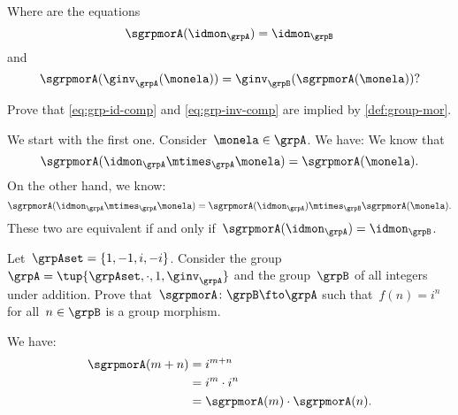 Where are the equations
\begin{equation}
  \label{eq:grp-id-comp}
  \sgrpmorA (\idmon_\grpA) = \idmon_{\grpB}
\end{equation}
and
\begin{equation}
  \label{eq:grp-inv-comp}
  \sgrpmorA (\ginv_\grpA(\monela)) = \ginv_\grpB(\sgrpmorA(\monela))?
\end{equation}

\begin{exercise}
  Prove that \cref{eq:grp-id-comp} and \cref{eq:grp-inv-comp} are implied by \cref{def:group-mor}.
\end{exercise}
\begin{solution}
  We start with the first one. Consider~$\monela \in \grpA$. We have:
  We know that
   \begin{equation*}
      \sgrpmorA(\idmon_\grpA \mtimes_\grpA \monela)=\sgrpmorA(\monela).
    \end{equation*}
  On the other hand, we know:
  \begin{equation*}
      \sgrpmorA(\idmon_\grpA \mtimes_\grpA \monela) = \sgrpmorA(\idmon_\grpA)\mtimes_\grpB \sgrpmorA(\monela).
\end{equation*}
  These two are equivalent if and only if~$\sgrpmorA(\idmon_\grpA)=\idmon_\grpB$.
\end{solution}

\begin{exercise}
  Let~$\grpAset=\{1,-1,i,-i\}$. Consider the group~$\grpA=\tup{\grpAset, \cdot, 1, \ginv_\grpA}$ and the group~$\grpB$ of all integers under addition.
  Prove that~$\sgrpmorA\colon \grpB \fto \grpA$ such that~$f(n)=i^n$ for all~$n\in \grpB$ is a group morphism.
\end{exercise}
\begin{solution}
We have:
  \begin{equation*}
    \begin{aligned}
      \sgrpmorA(m+n)&=i^{m+n}\\
      &=i^m \cdot i^n\\
      &=\sgrpmorA(m)\cdot \sgrpmorA(n).
\end{aligned}
\end{equation*}
\end{solution}

